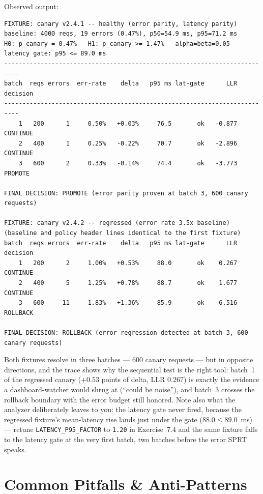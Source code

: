 Observed output:

\begin{verbatim}
FIXTURE: canary v2.4.1 -- healthy (error parity, latency parity)
baseline: 4000 reqs, 19 errors (0.47%), p50=54.9 ms, p95=71.2 ms
H0: p_canary = 0.47%   H1: p_canary >= 1.47%   alpha=beta=0.05   latency gate: p95 <= 89.0 ms
--------------------------------------------------------------------------
batch  reqs errors  err-rate    delta   p95 ms lat-gate      LLR  decision
--------------------------------------------------------------------------
    1   200      1     0.50%   +0.03%     76.5       ok   -0.877  CONTINUE
    2   400      1     0.25%   -0.22%     70.7       ok   -2.896  CONTINUE
    3   600      2     0.33%   -0.14%     74.4       ok   -3.773  PROMOTE

FINAL DECISION: PROMOTE (error parity proven at batch 3, 600 canary requests)

FIXTURE: canary v2.4.2 -- regressed (error rate 3.5x baseline)
(baseline and policy header lines identical to the first fixture)
batch  reqs errors  err-rate    delta   p95 ms lat-gate      LLR  decision
    1   200      2     1.00%   +0.53%     88.0       ok    0.267  CONTINUE
    2   400      5     1.25%   +0.78%     88.7       ok    1.677  CONTINUE
    3   600     11     1.83%   +1.36%     85.9       ok    6.516  ROLLBACK

FINAL DECISION: ROLLBACK (error regression detected at batch 3, 600 canary requests)
\end{verbatim}

Both fixtures resolve in three batches --- 600 canary requests --- but in
opposite directions, and the trace shows why the sequential test is the
right tool: batch~1 of the regressed canary ($+0.53$ points of delta,
LLR $0.267$) is exactly the evidence a dashboard-watcher would shrug at
(``could be noise''), and batch~3 crosses the rollback boundary with the
error budget still honored. Note also what the analyzer deliberately
leaves to you: the latency gate never fired, because the regressed
fixture's mean-latency rise lands just under the gate
($88.0 \le 89.0$~ms) --- retune \texttt{LATENCY\_P95\_FACTOR} to
\texttt{1.20} in Exercise~7.4 and the same fixture falls to the latency
gate at the very first batch, two batches before the error SPRT speaks.

\section{Common Pitfalls \& Anti-Patterns}
\label{sec:ch17-pitfalls}

